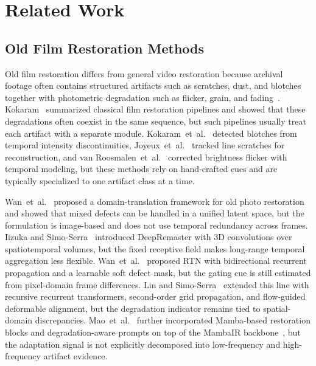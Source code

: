 \section{Related Work}\label{sec:related_work}

\subsection{Old Film Restoration Methods}

Old film restoration differs from general video restoration because archival footage often contains structured artifacts such as scratches, dust, and blotches together with photometric degradation such as flicker, grain, and fading~\cite{kokaram1998motion}. Kokaram~\cite{kokaram1998motion} summarized classical film restoration pipelines and showed that these degradations often coexist in the same sequence, but such pipelines usually treat each artifact with a separate module. Kokaram~et~al.~\cite{kokaram1995blotch} detected blotches from temporal intensity discontinuities, Joyeux~et~al.~\cite{joyeux2001scratch} tracked line scratches for reconstruction, and van Roosmalen~et~al.~\cite{vanroosmalen1999flicker} corrected brightness flicker with temporal modeling, but these methods rely on hand-crafted cues and are typically specialized to one artifact class at a time.

Wan~et~al.~\cite{wan2020bringing} proposed a domain-translation framework for old photo restoration and showed that mixed defects can be handled in a unified latent space, but the formulation is image-based and does not use temporal redundancy across frames. Iizuka and Simo-Serra~\cite{iizuka2019deepremaster} introduced DeepRemaster with 3D convolutions over spatiotemporal volumes, but the fixed receptive field makes long-range temporal aggregation less flexible. Wan~et~al.~\cite{rtn2022} proposed RTN with bidirectional recurrent propagation and a learnable soft defect mask, but the gating cue is still estimated from pixel-domain frame differences. Lin and Simo-Serra~\cite{rrtn2024} extended this line with recursive recurrent transformers, second-order grid propagation, and flow-guided deformable alignment, but the degradation indicator remains tied to spatial-domain discrepancies. Mao~et~al.~\cite{mao2025mambaofr} further incorporated Mamba-based restoration blocks and degradation-aware prompts on top of the MambaIR backbone~\cite{guo2024mambair}, but the adaptation signal is not explicitly decomposed into low-frequency and high-frequency artifact evidence.

